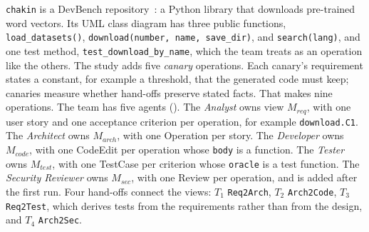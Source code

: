 \documentclass[10pt,conference]{IEEEtran}
\theoremstyle{definition}
\newcommand{\cls}[1]{\textsf{#1}}
\newcommand{\code}[1]{\texttt{#1}}
\begin{document}
\code{chakin} is a DevBench repository~\cite{li2024devbench}: a Python library that downloads pre-trained
word vectors. Its UML class diagram has three public functions, \code{load\_datasets()},
\code{download(number, name, save\_dir)}, and \code{search(lang)}, and one test method,
\code{test\_download\_by\_name}, which the team treats as an operation like the others. The study adds five
\emph{canary} operations. Each canary's requirement states a constant, for example a threshold, that the
generated code must keep; canaries measure whether hand-offs preserve stated facts. That makes nine
operations. The team has five agents (). The \emph{Analyst} owns view $M_{req}$, with one
user story and one acceptance criterion per operation, for example \code{download.C1}. The \emph{Architect}
owns $M_{arch}$, with one \cls{Operation} per story. The \emph{Developer} owns $M_{code}$, with one
\cls{CodeEdit} per operation whose \code{body} is a function. The \emph{Tester} owns $M_{test}$, with one
\cls{TestCase} per criterion whose \code{oracle} is a test function. The \emph{Security Reviewer} owns
$M_{sec}$, with one \cls{Review} per operation, and is added after the first run. Four hand-offs connect the
views: $T_1$ \code{Req2Arch}, $T_2$ \code{Arch2Code}, $T_3$ \code{Req2Test}, which derives tests from the
requirements rather than from the design, and $T_4$ \code{Arch2Sec}.
\end{document}

